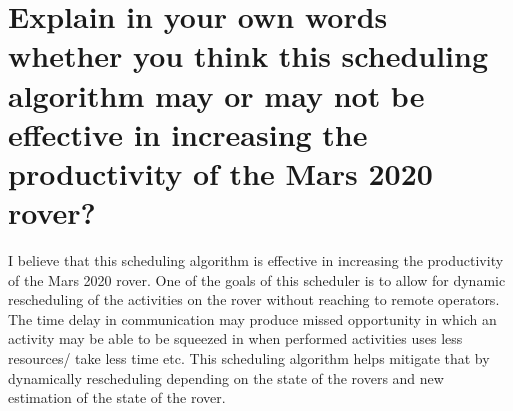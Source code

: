 \documentclass{article}
\begin{document}
\section{Explain in your own words whether you think this scheduling algorithm may or may not be effective in increasing the productivity of the Mars 2020 rover?}
I believe that this scheduling algorithm is effective in increasing the productivity of the Mars 2020 rover.
One of the goals of this scheduler is to allow for dynamic rescheduling of the activities on the rover without reaching to remote operators.
The time delay in communication may produce missed opportunity in which an activity may be
able to be squeezed in when performed activities uses less resources/ take less time etc.
This scheduling algorithm helps mitigate that by dynamically rescheduling depending on the
state of the rovers and new estimation of the state of the rover. 
\end{document}
